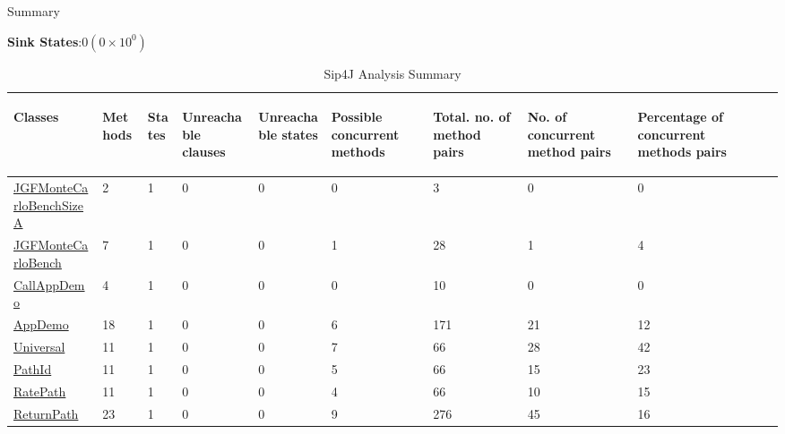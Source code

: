 \documentclass[10pt]{article}
\begin{document}
\begin{center}\huge{Summary}\end{center}
\textbf{Sink States}:$ 0 (0\times10^0)$
\begin{longtable}{|l|l|l|l|l|l|l|l|l|l|}
\caption{Sip4J Analysis Summary}\\
\hline
\begin{sideways}{\color{BlueGreen}Classes}\end{sideways}&\begin{sideways}{\color{BlueGreen}Methods}\end{sideways}&\begin{sideways}{\color{BlueGreen}States}\end{sideways}&\begin{sideways}{\color{BlueGreen}Unreachable clauses}\end{sideways}&\begin{sideways}{\color{BlueGreen}Unreachable states}\end{sideways}&\begin{sideways}{\color{BlueGreen} Possible concurrent methods}\end{sideways}&\begin{sideways}{\color{BlueGreen} Total. no. of method pairs}\end{sideways}&\begin{sideways}{\color{BlueGreen} No. of concurrent method pairs}\end{sideways}&\begin{sideways}{\color{BlueGreen} Percentage of concurrent methods pairs}\end{sideways}\\
\hline
\hyperref[JGFMonteCarloBenchSizeA]{\color{Fuchsia}JGFMonteCarloBenchSizeA}&2&1&0&0&0&3&0&0\\
\hline
\hyperref[JGFMonteCarloBench]{\color{Fuchsia}JGFMonteCarloBench}&7&1&0&0&1&28&1&4\\
\hline
\hyperref[CallAppDemo]{\color{Fuchsia}CallAppDemo}&4&1&0&0&0&10&0&0\\
\hline
\hyperref[AppDemo]{\color{Fuchsia}AppDemo}&18&1&0&0&6&171&21&12\\
\hline
\hyperref[Universal]{\color{Fuchsia}Universal}&11&1&0&0&7&66&28&42\\
\hline
\hyperref[PathId]{\color{Fuchsia}PathId}&11&1&0&0&5&66&15&23\\
\hline
\hyperref[RatePath]{\color{Fuchsia}RatePath}&11&1&0&0&4&66&10&15\\
\hline
\hyperref[ReturnPath]{\color{Fuchsia}ReturnPath}&23&1&0&0&9&276&45&16\\

\end{longtable}
\end{document}

